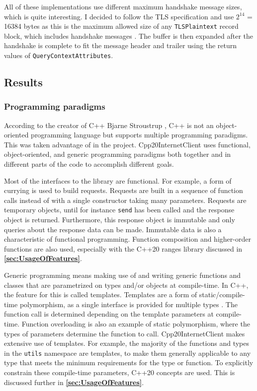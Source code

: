 \documentclass[12pt, a4paper]{article}
\begin{document}
All of these implementations use different maximum handshake message sizes, which is quite interesting. I decided to follow the TLS specification and use $2^{14}$ = 16384 bytes as this is the maximum allowed size of any \texttt{TLSPlaintext} record block, which includes handshake messages \parencite{TlsSpec}. The buffer is then expanded after the handshake is complete to fit the message header and trailer using the return values of \texttt{QueryContextAttributes}.
\subsection{Results}\label{sec:Results}
\subsubsection{Programming paradigms}
According to the creator of C++ Bjarne Stroustrup \parencite*{CppNotJustObjectOriented}, C++ is not an object-oriented programming language but supports multiple programming paradigms. This was taken advantage of in the project. Cpp20InternetClient uses functional, object-oriented, and generic programming paradigms both together and in different parts of the code to accomplish different goals. 

Most of the interfaces to the library are functional. For example, a form of currying is used to build requests. Requests are built in a sequence of function calls instead of with a single constructor taking many parameters. Requests are temporary objects, until for instance \texttt{send} has been called and the response object is returned. Furthermore, this response object is immutable and only queries about the response data can be made. Immutable data is also a characteristic of functional programming. Function composition and higher-order functions are also used, especially with the C++20 ranges library discussed in \textbf{\ref{sec:UsageOfFeatures}}.

Generic programming means making use of and writing generic functions and classes that are parametrized on types and/or objects at compile-time. In C++, the feature for this is called templates. Templates are a form of static/compile-time polymorphism, as a single interface is provided for multiple types \parencite{StaticPolymorphism}. The function call is determined depending on the template parameters at compile-time. Function overloading is also an example of static polymorphism, where the types of parameters determine the function to call. Cpp20InternetClient makes extensive use of templates. For example, the majority of the functions and types in the \texttt{utils} namespace are templates, to make them generally applicable to any type that meets the minimum requirements for the type or function. To explicitly constrain these compile-time parameters, C++20 concepts are used. This is discussed further in \textbf{\ref{sec:UsageOfFeatures}}.
\end{document}
